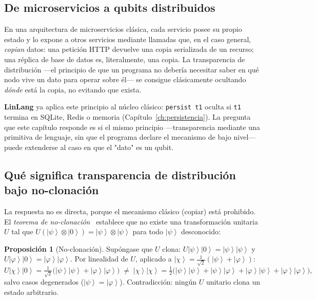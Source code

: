 \documentclass[12pt, a4paper, openany]{report}
\theoremstyle{definition}
\newtheorem{proposition}{Proposición}[chapter]
\newcommand{\linlang}{\textbf{LinLang}}
\newcommand{\ket}[1]{\left|#1\right\rangle}
\begin{document}
\subsection{De microservicios a qubits distribuidos}

En una arquitectura de microservicios clásica, cada servicio posee su propio estado y lo expone a otros servicios mediante llamadas que, en el caso general, \emph{copian} datos: una petición HTTP devuelve una copia serializada de un recurso; una réplica de base de datos es, literalmente, una copia. La transparencia de distribución —el principio de que un programa no debería necesitar saber en qué nodo vive un dato para operar sobre él— se consigue clásicamente ocultando \emph{dónde} está la copia, no evitando que exista.

\linlang{} ya aplica este principio al núcleo clásico: \texttt{persist t1} oculta si \texttt{t1} termina en SQLite, Redis o memoria (Capítulo~\ref{ch:persistencia}). La pregunta que este capítulo responde es si el mismo principio —transparencia mediante una primitiva de lenguaje, sin que el programa declare el mecanismo de bajo nivel— puede extenderse al caso en que el "dato" es un qubit.

\subsection{Qué significa transparencia de distribución bajo no-clonación}
\label{subsec:no-cloning}

La respuesta no es directa, porque el mecanismo clásico (copiar) está prohibido. El \emph{teorema de no-clonación}~\cite{wootters1982} establece que no existe una transformación unitaria $U$ tal que $U(\ket{\psi}\otimes\ket{0}) = \ket{\psi}\otimes\ket{\psi}$ para todo $\ket{\psi}$ desconocido:

\begin{proposition}[No-clonación]
\label{prop:no-cloning}
Supóngase que $U$ clona: $U\ket{\psi}\ket{0} = \ket{\psi}\ket{\psi}$ y $U\ket{\varphi}\ket{0} = \ket{\varphi}\ket{\varphi}$. Por linealidad de $U$, aplicado a $\ket{\chi} = \frac{1}{\sqrt2}(\ket{\psi}+\ket{\varphi})$:
\[
  U\ket{\chi}\ket{0} = \tfrac{1}{\sqrt2}\big(\ket{\psi}\ket{\psi} + \ket{\varphi}\ket{\varphi}\big) \;\neq\; \ket{\chi}\ket{\chi} = \tfrac12\big(\ket{\psi}\ket{\psi}+\ket{\psi}\ket{\varphi}+\ket{\varphi}\ket{\psi}+\ket{\varphi}\ket{\varphi}\big),
\]
salvo casos degenerados ($\ket{\psi}=\ket{\varphi}$). Contradicción: ningún $U$ unitario clona un estado arbitrario.
\end{proposition}
\end{document}
